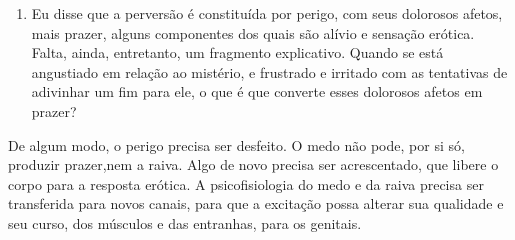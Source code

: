 \begin{enumerate}
Se a solução vai ou não na direção da sintomatologia neurótica, sem
um contorno nítido a acompanhá-la, o prazer erótico subjetivo depende,
creio, da natureza exata do sistema sutil, complicado, de recompensa e
punição que cada família, em geral sobretudo a mãe, desenvolve. Nas
perversões --- as neuroses eróticas --- a sensação de mistério e de
perigo se acentua, pois a criança foi traumatizada ou superestimulada
exatamente no ponto do mistério: os genitais, ou o desejo de
investigá-los. Fenichel\idxfenic{} sugere algo assim ao dizer que
``indivíduos em quem a angústia da castração\idxcasta{} foi provocada
muito subitamente, e de modo intenso, são candidatos a um posterior
desenvolvimento de fetichismo'' (19, p. 342); ele indica
assim, tal qual Freud\idxfreudperve{} fez antes, que a perversão pode resultar como uma
``cura'' para a angústia provocada pela
conscientização da existência da possibilidade de que se venha a perder\idxpervneuro[|)]
o próprio sexo. (Ver também 1, 53---55, 57, 58; 137, capítulo 19.)

\item Eu disse que a perversão é constituída por perigo, com seus
dolorosos afetos, mais prazer, alguns componentes dos quais são alívio
e sensação erótica. Falta, ainda, entretanto, um fragmento explicativo.
Quando se está angustiado em relação ao mistério, e frustrado e
irritado com as tentativas de adivinhar um fim para ele, o que é que
converte esses dolorosos afetos em prazer?
\end{enumerate}


De algum modo, o perigo precisa ser desfeito. O medo não pode, por
si só, produzir prazer,\idxpraz[|(] nem a raiva. Algo de novo precisa ser
acrescentado, que libere o corpo para a resposta erótica. A
psicofisiologia do medo e da raiva precisa ser transferida para novos
canais, para que a excitação possa alterar sua qualidade e seu curso,
dos músculos e das entranhas, para os genitais.

